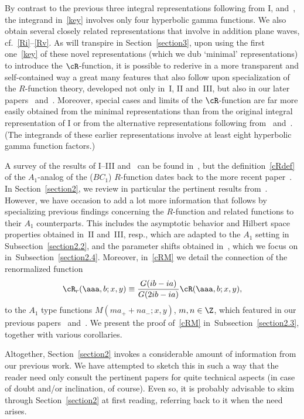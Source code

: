 \documentclass[pdftex]{sigma}
\numberwithin{equation}{section}
\begin{document}
By contrast to the previous three integral representations following from I, \cite{bult} and~\cite{bust}, the integrand in~\eqref{key}
involves only four hyperbolic gamma functions. We also obtain several closely related representations that involve in addition plane waves, cf.~\eqref{Ri}--\eqref{Rv}. As will transpire in Section~\ref{section3}, upon using the f\/irst one~\eqref{key} of these novel representations (which we dub `minimal' representations) to introduce the $\cR$-function, it is possible to rederive in a more transparent and self-contained way a great many features that also follow upon specialization of the $R$-function theory, developed not only in~I, II and~III, but also in our later papers~\cite{anne} and~\cite{quad}. Moreover, special cases and limits of the $\cR$-function are far more easily obtained from the minimal representations than from the original integral representation of I or from the alternative representations following from~\cite{bult} and~\cite{bust}. (The integrands of these earlier representations involve at least eight hyperbolic gamma function factors.)

A survey of the results of I--III and~\cite{anne} can be found in~\cite{Rsurv}, but the def\/inition~\eqref{cRdef} of the $A_1$-analog of the ($BC_1$) $R$-function dates back to the more recent paper~\cite{quad}. In Section~\ref{section2}, we review in particular the pertinent results from~\cite{quad}. However, we have occasion to  add a lot more information that follows by specializing previous f\/indings concerning the $R$-function and related functions to their $A_1$ counterparts. This includes the asymptotic behavior and Hilbert space properties obtained in~II and~III, resp., which are adapted to the $A_1$ setting in Subsection~\ref{section2.2}, and the parameter shifts obtained in~\cite{anne}, which we focus on in~Subsection~\ref{section2.4}.  Moreover, in~\eqref{cRM} we detail the connection of the renormalized function
\begin{gather}\label{cRr}
\cR_r(\aaa,b;x,y)\equiv  \frac{G(ib-ia)}{G(2ib-ia)}\cR(\aaa,b;x,y),
\end{gather}
to the $A_1$ type functions $M(ma_{+}+na_{-};x,y)$, $m,n\in\Z$, which featured in our previous papers~\cite{GLFII} and~\cite{Hilb}. We present the proof of~\eqref{cRM} in~Subsection~\ref{section2.3}, together with various corollaries.

Altogether, Section~\ref{section2} invokes a considerable amount of information from our previous work. We have attempted to sketch this in such a way that the reader need only consult the pertinent papers for quite technical aspects (in case of doubt and/or inclination, of course). Even so, it is probably advisable to skim through Section~\ref{section2} at f\/irst reading, referring back to it when the need arises.
\end{document}
